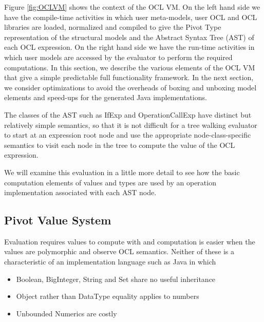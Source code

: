 \documentclass{sig-alternate}
\begin{document}
Figure \ref{fig:OCLVM} shows the context of the OCL VM. On the left hand side we have the compile-time activities in which
user meta-models, user OCL and OCL libraries are loaded, normalized and compiled to give the Pivot Type representation
of the structural models and the Abstract Syntax Tree (AST) of each OCL expression.
On the right hand side we have the run-time activities in which user models are accessed by the evaluator to perform the required computations. In this section, we describe the various elements of the OCL VM that give a simple predictable full functionality framework. In the next section, we consider optimizations to avoid the overheads of boxing and unboxing model elements
and speed-ups for the generated Java implementations.
  
The classes of the AST such as IfExp and OperationCallExp have distinct but relatively simple semantics, so that it is not difficult for a tree walking evaluator to start at an expression root node and use the appropriate
node-class-specific semantics to visit each node in the tree to compute the value of the OCL expression. 

We will examine this evaluation in a little more detail to see how the basic computation elements of values and types
are used by an operation implementation associated with each AST node.

\subsection{Pivot Value System}

Evaluation requires values to compute with and computation is easier when the values are polymorphic and observe OCL semantics. Neither of these is a characteristic of an implementation language such as Java in which 
\begin{itemize}
\item Boolean, BigInteger, String and Set share no useful inheritance
\item Object rather than DataType equality applies to numbers 
\item Unbounded Numerics are costly 
\end{itemize}
\end{document}
